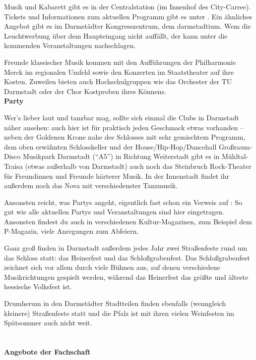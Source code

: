 {Musik und Kabarett gibt es in der Centralstation (im Innenhof des City-Carree). Tickets und Informationen zum aktuellen Programm gibt es unter \footnotemark[9]. Ein ähnliches Angebot gibt es im Darmstädter Kongresszentrum, dem darmstadtium. Wem die Leuchtwerbung über dem Haupteingang nicht auffällt, der kann unter \footnotemark[10] die kommenden Veranstaltungen nachschlagen.

Freunde klassischer Musik kommen mit den Aufführungen der Philharmonie Merck im regionalen Umfeld sowie den Konzerten im Staatstheater auf ihre Kosten. Zuweilen bieten auch Hochschulgruppen wie das Orchester der TU Darmstadt oder der Chor Kostproben ihres Könnens.\\

\textbf{Party}

Wer's lieber laut und tanzbar mag, sollte sich einmal die Clubs in Darmstadt näher ansehen: auch hier ist für praktisch jeden Geschmack etwas vorhanden – neben der Goldenen Krone nahe des Schlosses mit sehr gemischtem Programm, dem oben erwähnten Schlosskeller und der House/Hip-Hop/Dancehall Großraum-Disco Musikpark Darmstadt ("`A5"') in Richtung Weiterstadt gibt es in Mühltal-Traisa (etwas außerhalb von Darmstadt) auch noch das Steinbruch Rock-Theater für Freundinnen und Freunde härterer Musik.
In der Innenstadt findet ihr außerdem noch das Nova mit verschiedenster Tanzmusik.

Ansonsten reicht, was Partys angeht, eigentlich fast schon ein Verweis auf \footnotemark[11]: So gut wie alle aktuellen Partys und Veranstaltungen sind hier eingetragen. Ansonsten findest du auch in verschiedenen Kultur-Magazinen, zum Beispiel dem P-Magazin, viele Anregungen zum Abfeiern.

Ganz groß finden in Darmstadt außerdem jedes Jahr zwei Straßenfeste rund um das Schloss statt: das Heinerfest und das Schloßgrabenfest. Das Schloßgrabenfest zeichnet sich vor allem durch viele Bühnen aus, auf denen verschiedene Musikrichtungen gespielt werden, während das Heinerfest das größte und älteste hessische Volksfest ist.

Drumherum in den Darmstädter Stadtteilen finden ebenfalls (wenngleich kleinere) Straßenfeste statt und die Pfalz ist mit ihren vielen Weinfesten im Spätsommer auch nicht weit. \\
\\\\
\textbf{Angebote der Fachschaft}

}
